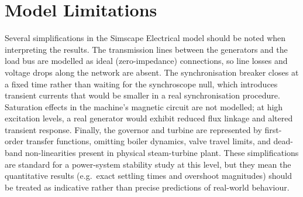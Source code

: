 \section{Model Limitations}

Several simplifications in the Simscape Electrical model should be noted when
interpreting the results. The transmission lines between the generators and the
load bus are modelled as ideal (zero-impedance) connections, so line losses
and voltage drops along the network are absent. The synchronisation breaker
closes at a fixed time rather than waiting for the synchroscope null, which
introduces transient currents that would be smaller in a real synchronisation
procedure. Saturation effects in the machine's magnetic circuit are not
modelled; at high excitation levels, a real generator would exhibit reduced
flux linkage and altered transient response. Finally, the governor and turbine
are represented by first-order transfer functions, omitting boiler dynamics,
valve travel limits, and dead-band non-linearities present in physical
steam-turbine plant. These simplifications are standard for a power-system
stability study at this level, but they mean the quantitative results
(e.g.\ exact settling times and overshoot magnitudes) should be treated as
indicative rather than precise predictions of real-world behaviour.
